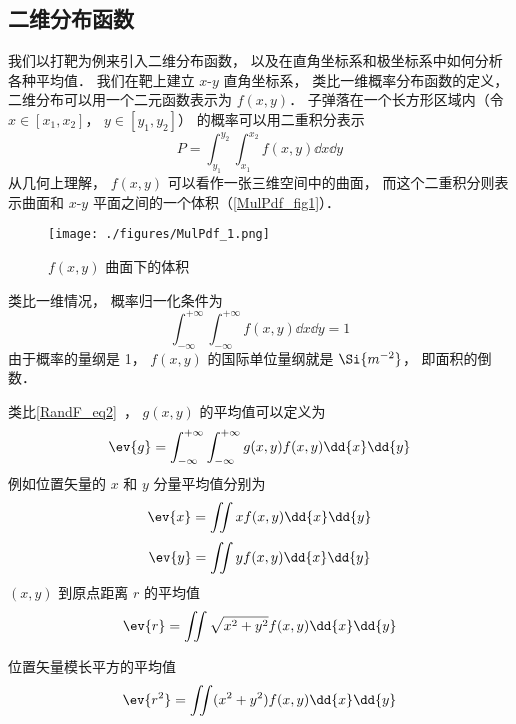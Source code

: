 


\subsection{二维分布函数}
我们以打靶为例来引入二维分布函数， 以及在直角坐标系和极坐标系中如何分析各种平均值． 我们在靶上建立 $x$-$y$ 直角坐标系， 类比一维概率分布函数的定义， 二维分布可以用一个二元函数表示为 $f(x, y)$． 子弹落在一个长方形区域内（令 $x \in [x_1, x_2]$， $y \in [y_1, y_2]$） 的概率可以用二重积分表示
\begin{equation}
P = \int_{y_1}^{y_2} \int_{x_1}^{x_2} f(x, y) \dd{x} \dd{y}
\end{equation}
从几何上理解， $f(x, y)$ 可以看作一张三维空间中的曲面， 而这个二重积分则表示曲面和 $x$-$y$ 平面之间的一个体积（\autoref{MulPdf_fig1}）．

\begin{figure}[ht]
\centering
\texttt{[image: ./figures/MulPdf\_1.png]}
\caption{$f(x, y)$ 曲面下的体积} \label{MulPdf_fig1}
\end{figure}

类比一维情况， 概率归一化条件为
\begin{equation}
\int_{-\infty}^{+\infty} \int_{-\infty}^{+\infty} f(x, y) \dd{x} \dd{y} = 1
\end{equation}
由于概率的量纲是 1， $f(x, y)$ 的国际单位量纲就是 $\Si{m^{-2}}$， 即面积的倒数．

类比\autoref{RandF_eq2}~， $g(x, y)$ 的平均值可以定义为
\begin{equation}
\ev{g} =  \int_{-\infty}^{+\infty} \int_{-\infty}^{+\infty} g(x, y) f(x, y) \dd{x} \dd{y}
\end{equation}
例如位置矢量的 $x$ 和 $y$ 分量平均值分别为
\begin{equation}\label{MulPdf_eq2}
\ev{x} = \iint x f(x, y) \dd{x}\dd{y}
\end{equation}
\begin{equation}
\ev{y} = \iint y f(x, y) \dd{x}\dd{y}
\end{equation}
$(x,y)$ 到原点距离 $r$ 的平均值
\begin{equation}
\ev{r} = \iint \sqrt{x^2 + y^2} f(x, y) \dd{x}\dd{y}
\end{equation}

位置矢量模长平方的平均值
\begin{equation}
\ev{r^2} = \iint (x^2 + y^2) f(x, y) \dd{x}\dd{y}
\end{equation}

